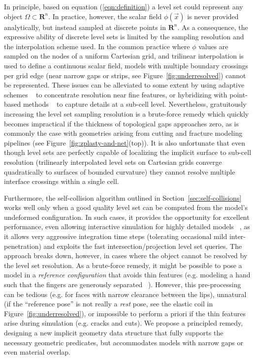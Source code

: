 In principle, based on equation (\ref{eqn:definition}) a level set
could represent any object $\Omega\subset\mathbf{R}^n$. In practice,
however, the scalar field $\phi(\vec{x})$ is never provided
analytically, but  instead sampled at discrete points in
$\mathbf{R}^n$. As a consequence, the expressive ability of discrete
level sets is limited by the sampling resolution and the interpolation
scheme used. In the common practice where $\phi$ values are sampled on
the nodes of a uniform Cartesian grid, and trilinear interpolation is
used to define a continuous scalar field, models with multiple
boundary crossings per grid edge (near narrow gaps or strips, see
Figure~\ref{fig:underresolved}) cannot be represented. These issues
can be alleviated to some extent by using adaptive schemes
~\citep{LosasGF:2004,Muset:2013} to concentrate resolution near fine
features, or hybridizing with point-based methods ~\citep{EnrigMF:2002}
to capture details at a sub-cell level. Nevertheless, gratuitously
increasing the level set sampling resolution is a brute-force remedy
which quickly becomes impractical if the thickness of topological gaps
approaches zero, as is commonly the case with geometries arising from
cutting and fracture modeling pipelines (see
Figure~\ref{fig:zplasty-and-net}(top)). It is also unfortunate that
even though level sets are perfectly capable of localizing the
implicit surface to sub-cell resolution (trilinearly interpolated
level sets on Cartesian grids converge quadratically to surfaces of
bounded curvature) they cannot resolve multiple interface crossings
within a single cell.

Furthermore, the self-collision algorithm outlined in
Section~\ref{sec:self-collisions} works well only when a good quality
level set can be computed from the model's undeformed
configuration. In such cases, it provides the opportunity for
excellent performance, even allowing interactive simulation for highly
detailed models ~\citep{McAdaZSETTS:2011}, as it allows very aggressive
integration time steps (tolerating occasional mild inter-penetration)
and exploits the fast intersection/projection level set queries. The
approach breaks down, however, in cases where the object cannot be
resolved by the level set resolution. As a brute-force remedy, it might be
possible to pose a model in a \emph{reference configuration} that
avoids thin features (e.g. modeling a hand such that the fingers are
generously separated ~\citep{McAdaZSETTS:2011}). However, this
pre-processing can be tedious (e.g. for faces with narrow clearance
between the lips), unnatural (if the ``reference pose'' is not really
a \emph{rest} pose, see the elastic coil in
Figure~\ref{fig:underresolved}), or impossible to perform a priori if
the thin features arise during simulation (e.g. cracks and cuts). We
propose a principled remedy, designing a new implicit geometry data
structure that fully supports the necessary geometric predicates, but
accommodates models with narrow gaps or even material overlap.

